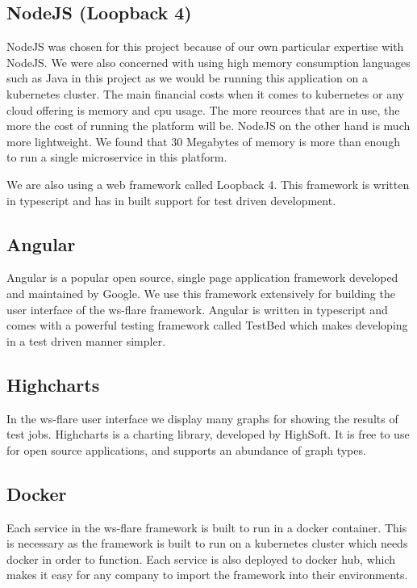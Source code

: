 \subsection{NodeJS (Loopback 4)}

NodeJS was chosen for this project because of our own particular expertise with NodeJS. We were also concerned with using high memory consumption languages such as Java in this project as we would be running this application on a kubernetes cluster. The main financial costs when it comes to kubernetes or any cloud offering is memory and cpu usage. The more reources that are in use, the more the cost of running the platform will be. NodeJS on the other hand is much more lightweight. We found that 30 Megabytes of memory is more than enough to run a single microservice in this platform. 

We are also using a web framework called Loopback 4. This framework is written in typescript and has in built support for test driven development.

\subsection{Angular}

Angular is a popular open source, single page application framework developed and maintained by Google. We use this framework extensively for building the user interface of the ws-flare framework. Angular is written in typescript and comes with a powerful testing framework called TestBed which makes developing in a test driven manner simpler.

\subsection{Highcharts}

In the ws-flare user interface we display many graphs for showing the results of test jobs. Highcharts is a charting library, developed by HighSoft. It is free to use for open source applications, and supports an abundance of graph types.

\subsection{Docker}

Each service in the ws-flare framework is built to run in a docker container. This is necessary as the framework is built to run on a kubernetes cluster which needs docker in order to function. Each service is also deployed to docker hub, which makes it easy for any company to import the framework into their environments.

